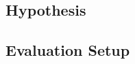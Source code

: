 \documentclass[sigplan,screen]{acmart}
\begin{document}
\subsection{Hypothesis}


\subsection{Evaluation Setup}




\end{document}
